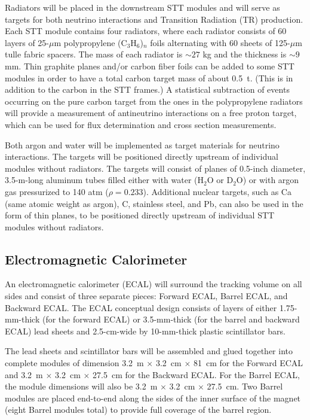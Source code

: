 Radiators will be placed in the downstream STT modules
and will serve as targets for both neutrino interactions 
and Transition Radiation (TR) production. Each STT module contains 
four radiators, where each radiator consists of
60 layers of 25-$\mu$m polypropylene (C$_3$H$_6$)$_n$ 
foils alternating with 60 sheets of 125-$\mu$m tulle fabric spacers. 
The mass of each radiator is $\sim27$ kg and the thickness is 
$\sim9$ mm. 
Thin graphite planes and/or carbon fiber foils can be added to some STT modules
in order to have a total carbon target mass of about 0.5~t. (This is in addition to
the carbon in the STT frames.) A statistical subtraction of events occurring
on the pure carbon target from the ones in the polypropylene radiators will provide a measurement of
antineutrino interactions on a free proton target, which can be used for flux determination and cross
section measurements.

Both argon
and water will be implemented as target materials for neutrino interactions.
The targets will be 
positioned directly upstream of individual modules without radiators. 
The targets will consist of planes of 0.5-inch diameter, 3.5-m-long aluminum tubes filled
either with water (H$_2$O or D$_2$O) or with argon gas pressurized to 140 atm ($\rho = 0.233$).
Additional nuclear targets, such as Ca (same atomic weight as argon), C, stainless
steel, and Pb, can also be used in
the form of thin planes, to be positioned directly upstream of individual STT modules without radiators.



\subsection{Electromagnetic Calorimeter}
\label{cdrsec:detectors-nd-ref-fgt-ecal}

An electromagnetic calorimeter 
(ECAL) will surround the tracking volume on all sides and consist of three separate pieces: Forward ECAL, Barrel ECAL, and Backward ECAL.  
The ECAL conceptual design consists of 
layers of either 1.75-mm-thick (for the forward ECAL) or 3.5-mm-thick 
(for the barrel and backward ECAL) lead sheets and 2.5-cm-wide by 10-mm-thick 
plastic scintillator bars.

The lead sheets and scintillator bars will be assembled and glued together
into complete modules of dimension 
3.2~m $\times$ 3.2~cm $\times$ 81~cm for the Forward ECAL and
3.2~m $\times$ 3.2~cm $\times$ 27.5~cm for the Backward ECAL. For the Barrel ECAL, the module 
dimensions will also be 
3.2~m $\times$ 3.2~cm $\times$ 27.5~cm. Two Barrel modules are placed end-to-end 
along the sides of the inner surface of the magnet (eight Barrel modules
total) to provide full coverage of the barrel region.

